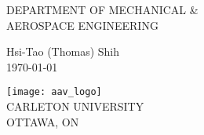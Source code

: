 \begin{titlepage}
    \begin{center}
        \vspace{1cm}
 
        \large
        DEPARTMENT OF MECHANICAL \& \\
        AEROSPACE ENGINEERING
 
        \vspace{5em}

        \huge

        \vspace{3em}
 
        \large

        \vspace{1em}
        Hsi-Tao (Thomas) Shih\\
        \today
 
        \vfill
             
        \vspace{1em}
      
        \texttt{[image: aav\_logo]}\\
        \footnotesize
        CARLETON UNIVERSITY\\
        OTTAWA, ON
             
    \end{center}
\end{titlepage}